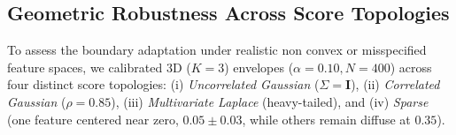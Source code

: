 \begin{table}[!htbp]
\centering
\small
\setlength{\tabcolsep}{3pt} %
\caption{Dimensionality scaling experiment ($K \in \{2,5,10,20\}$, nominal $1-\alpha = 0.900$, $N = 2\,000$). Empirical 
coverage and calibrated size scaling factors $\hat{t}$ are reported across envelope geometries.}
\label{tab: dim scaling results}
\end{table}



\subsection{Geometric Robustness Across Score Topologies}
\label{sec5.1.3: distribution robustness}

To assess the boundary adaptation under realistic non convex or misspecified feature spaces, we calibrated 
$3\text{D}$ ($K=3$) envelopes ($\alpha = 0.10, N = 400$) across four distinct score topologies: (i) \emph{Uncorrelated 
Gaussian} ($\Sigma = \mathbf{I}$), (ii) \emph{Correlated Gaussian} ($\rho = 0.85$), (iii) \emph{Multivariate 
Laplace} (heavy-tailed), and (iv) \emph{Sparse} (one feature centered near zero, $0.05 \pm 0.03$, while others remain 
diffuse at $0.35$).


